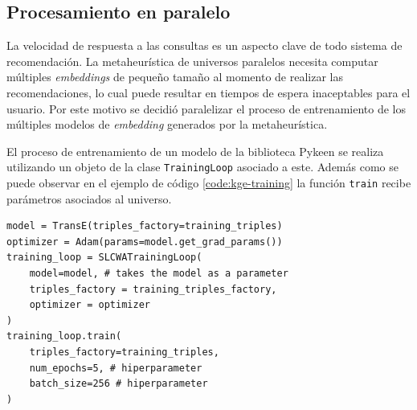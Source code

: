 







\subsection{Procesamiento en paralelo}
La velocidad de respuesta a las consultas es un aspecto
clave de todo sistema de recomendaci\'on. La metaheur\'istica de universos paralelos necesita computar
m\'ultiples \textit{embeddings} de peque\~no tama\~no al momento de realizar las
recomendaciones, lo cual puede resultar en tiempos de espera inaceptables para el usuario.
Por este motivo se decidi\'o paralelizar el proceso de entrenamiento de
los m\'ultiples modelos de \textit{embedding} generados por la metaheur\'istica.

El proceso de entrenamiento de un modelo de la biblioteca Pykeen se realiza
utilizando un objeto de la clase \texttt{TrainingLoop} asociado a este.
Adem\'as como se puede observar en el ejemplo de c\'odigo \ref{code:kge-training}
la funci\'on \texttt{train} recibe par\'ametros asociados al universo.



\label{code:kge-training}
\begin{lstlisting}[caption=Proceso de entrenamiento de los modelos de KGE, label = code:kge-trainig]
model = TransE(triples_factory=training_triples)
optimizer = Adam(params=model.get_grad_params())
training_loop = SLCWATrainingLoop(
    model=model, # takes the model as a parameter
    triples_factory = training_triples_factory,
    optimizer = optimizer
)
training_loop.train(
    triples_factory=training_triples,
    num_epochs=5, # hiperparameter
    batch_size=256 # hiperparameter
)
\end{lstlisting}


